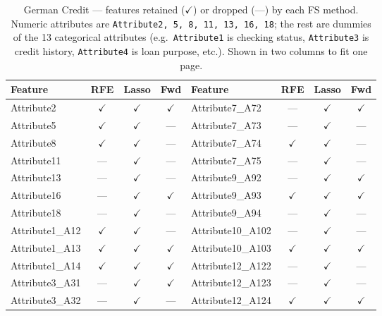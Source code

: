 \begin{table}[H]
\centering
\caption{German Credit --- features retained ($\checkmark$) or
dropped (---) by each FS method.  Numeric attributes are
\texttt{Attribute2, 5, 8, 11, 13, 16, 18}; the rest are dummies of
the 13 categorical attributes (e.g.\ \texttt{Attribute1} is checking
status, \texttt{Attribute3} is credit history, \texttt{Attribute4}
is loan purpose, etc.). Shown in two columns to fit one page.}
\singlespacing
\label{tab:fs-ger}
\scriptsize
\begin{tabular}{l c c c | l c c c}
\toprule
\textbf{Feature} & \textbf{RFE} & \textbf{Lasso} & \textbf{Fwd}
& \textbf{Feature} & \textbf{RFE} & \textbf{Lasso} & \textbf{Fwd}\\
\midrule
Attribute2          & $\checkmark$ & $\checkmark$ & $\checkmark$ & Attribute7\_A72  & ---          & $\checkmark$ & $\checkmark$\\
Attribute5          & $\checkmark$ & $\checkmark$ & ---          & Attribute7\_A73  & ---          & $\checkmark$ & ---\\
Attribute8          & $\checkmark$ & $\checkmark$ & ---          & Attribute7\_A74  & $\checkmark$ & $\checkmark$ & ---\\
Attribute11         & ---          & $\checkmark$ & ---          & Attribute7\_A75  & ---          & $\checkmark$ & ---\\
Attribute13         & ---          & $\checkmark$ & ---          & Attribute9\_A92  & ---          & $\checkmark$ & $\checkmark$\\
Attribute16         & ---          & $\checkmark$ & $\checkmark$ & Attribute9\_A93  & $\checkmark$ & $\checkmark$ & $\checkmark$\\
Attribute18         & ---          & $\checkmark$ & ---          & Attribute9\_A94  & ---          & $\checkmark$ & ---\\
Attribute1\_A12     & $\checkmark$ & $\checkmark$ & ---          & Attribute10\_A102 & ---         & $\checkmark$ & ---\\
Attribute1\_A13     & $\checkmark$ & $\checkmark$ & $\checkmark$ & Attribute10\_A103 & $\checkmark$ & $\checkmark$ & $\checkmark$\\
Attribute1\_A14     & $\checkmark$ & $\checkmark$ & $\checkmark$ & Attribute12\_A122 & ---         & $\checkmark$ & ---\\
Attribute3\_A31     & ---          & $\checkmark$ & $\checkmark$ & Attribute12\_A123 & ---         & $\checkmark$ & ---\\
Attribute3\_A32     & ---          & $\checkmark$ & ---          & Attribute12\_A124 & $\checkmark$ & $\checkmark$ & $\checkmark$\\

\end{tabular}
\end{table}
